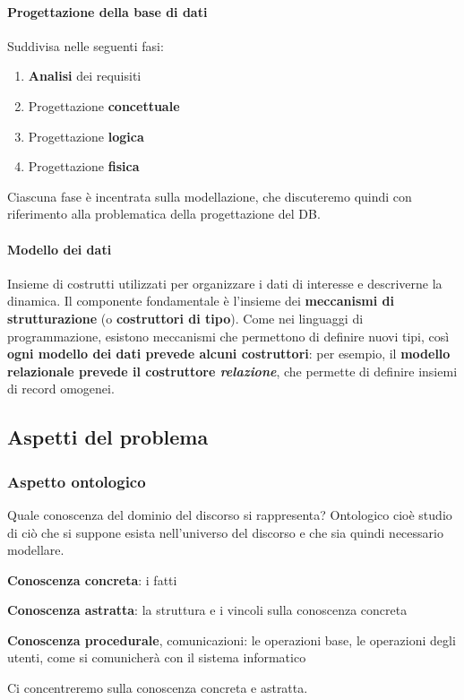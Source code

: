 \documentclass[10pt]{book}
\begin{document}
\paragraph{Progettazione della base di dati} Suddivisa nelle seguenti fasi:
\begin{enumerate}
	\item \textbf{Analisi} dei requisiti
	\item Progettazione \textbf{concettuale}
	\item Progettazione \textbf{logica}
	\item Progettazione \textbf{fisica}
\end{enumerate}
Ciascuna fase è incentrata sulla modellazione, che discuteremo quindi con riferimento alla problematica della progettazione del DB.
\paragraph{Modello dei dati} Insieme di costrutti utilizzati per organizzare i dati di interesse e descriverne la dinamica. Il componente fondamentale è l'insieme dei \textbf{meccanismi di strutturazione} (o \textbf{costruttori di tipo}). Come nei linguaggi di programmazione, esistono meccanismi che permettono di definire nuovi tipi, così \textbf{ogni modello dei dati prevede alcuni costruttori}: per esempio, il \textbf{modello relazionale prevede il costruttore \textit{relazione}}, che permette di definire insiemi di record omogenei.
\pagebreak
\subsection{Aspetti del problema}
\subsubsection{Aspetto ontologico} Quale conoscenza del dominio del discorso si rappresenta? Ontologico cioè studio di ciò che si suppone esista nell'universo del discorso e che sia quindi necessario modellare.
\begin{list}{}{Cosa si modella:}
	\item \textbf{Conoscenza concreta}: i fatti
	\item \textbf{Conoscenza astratta}: la struttura e i vincoli sulla conoscenza concreta
	\item \textbf{Conoscenza procedurale}, comunicazioni: le operazioni base, le operazioni degli utenti, come si comunicherà con il sistema informatico
\end{list}
Ci concentreremo sulla conoscenza concreta e astratta.
\end{document}
